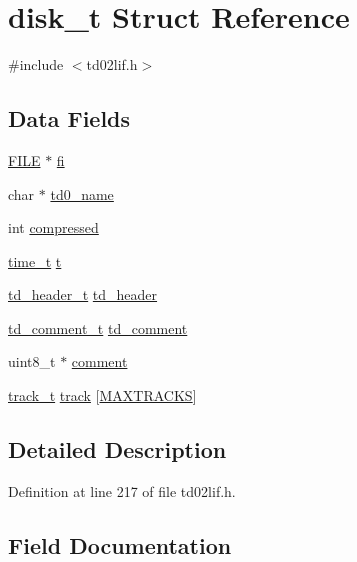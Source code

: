 \hypertarget{structdisk__t}{}\section{disk\+\_\+t Struct Reference}
\label{structdisk__t}


{\ttfamily \#include $<$td02lif.\+h$>$}

\subsection*{Data Fields}
\begin{DoxyCompactItemize}
\item 
\hyperlink{posix_8h_aed4dabeb9f7c518ded42f930a04abce8}{F\+I\+LE} $\ast$ \hyperlink{structdisk__t_a1832d0f8cdda8f731de9e1daea2900a5}{fi}
\item 
char $\ast$ \hyperlink{structdisk__t_a8be70c86aaffb22bab0e0969630a7062}{td0\+\_\+name}
\item 
int \hyperlink{structdisk__t_abe333f1a8b322fbed0d1c1178939016e}{compressed}
\item 
\hyperlink{time_8h_a3346b04b0420b32ccf6b706551b70762}{time\+\_\+t} \hyperlink{structdisk__t_a6cb7e0306f35b8b97bf3ef18e2f45455}{t}
\item 
\hyperlink{structtd__header__t}{td\+\_\+header\+\_\+t} \hyperlink{structdisk__t_a83cf946593922db2bdedef21bb7b4aff}{td\+\_\+header}
\item 
\hyperlink{structtd__comment__t}{td\+\_\+comment\+\_\+t} \hyperlink{structdisk__t_a7d84ffa6301a1e05b5a8a686d710bb8f}{td\+\_\+comment}
\item 
uint8\+\_\+t $\ast$ \hyperlink{structdisk__t_abd7a6652f29f0059638dab7a88558783}{comment}
\item 
\hyperlink{structtrack__t}{track\+\_\+t} \hyperlink{structdisk__t_a6498dff29cc11a772be6e0cabb54520f}{track} \mbox{[}\hyperlink{td02lif_8h_ade239296a2facdacc8b64d0791e2d806}{M\+A\+X\+T\+R\+A\+C\+KS}\mbox{]}
\end{DoxyCompactItemize}


\subsection{Detailed Description}


Definition at line 217 of file td02lif.\+h.



\subsection{Field Documentation}
\mbox{\label{structdisk__t_abd7a6652f29f0059638dab7a88558783}} 
